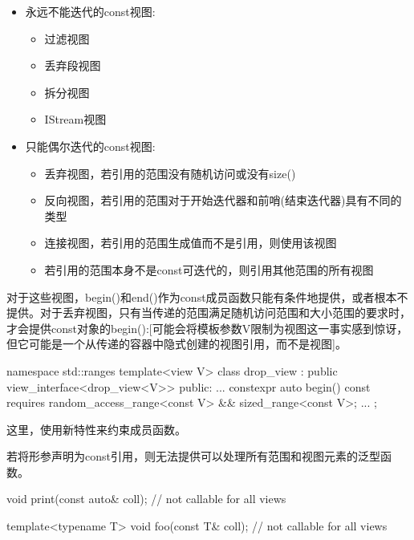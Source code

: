 \begin{itemize}
\item
永远不能迭代的const视图:

\begin{itemize}
\item
过滤视图

\item
丢弃段视图

\item
拆分视图

\item
IStream视图
\end{itemize}

\item
只能偶尔迭代的const视图:

\begin{itemize}
\item
丢弃视图，若引用的范围没有随机访问或没有size()

\item
反向视图，若引用的范围对于开始迭代器和前哨(结束迭代器)具有不同的类型

\item
连接视图，若引用的范围生成值而不是引用，则使用该视图

\item
若引用的范围本身不是const可迭代的，则引用其他范围的所有视图
\end{itemize}
\end{itemize}

对于这些视图，begin()和end()作为const成员函数只能有条件地提供，或者根本不提供。对于丢弃视图，只有当传递的范围满足随机访问范围和大小范围的要求时，才会提供const对象的begin():[可能会将模板参数V限制为视图这一事实感到惊讶，但它可能是一个从传递的容器中隐式创建的视图引用，而不是视图]。


\begin{cpp}
namespace std::ranges {
	template<view V>
	class drop_view : public view_interface<drop_view<V>> {
		public:
		...
		constexpr auto begin() const requires random_access_range<const V>
		&& sized_range<const V>;
		...
	};
}
\end{cpp}

这里，使用新特性来约束成员函数。

若将形参声明为const引用，则无法提供可以处理所有范围和视图元素的泛型函数。

\begin{cpp}
void print(const auto& coll); // not callable for all views

template<typename T>
void foo(const T& coll); // not callable for all views
\end{cpp}

